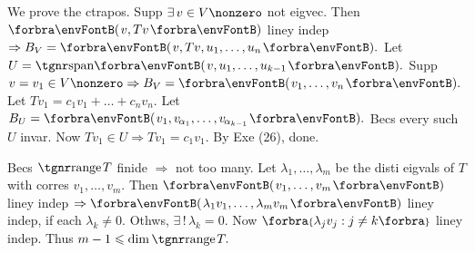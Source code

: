 We prove the ctrapos. Supp $\exists\,v\in V\nonzero$ not eigvec.\parSol{}
Then $\Par{v,Tv}$ liney indep $\Rightarrow B_V=\Par{v,Tv,u_1,\dots,u_n}.$ Let $U=\Span{v,u_1,\dots,u_{k-1}}.$\PfEnd\vspace{3pt}\parSol{}
\Or Supp $v=v_1\in V\nonzero\Rightarrow B_V=\Par{v_1,\dots,v_n}.$ Let $Tv_1=c_1 v_1+\dots+c_n v_n.$\parSol{}
Let $B_U=\Par{v_1,v_{\:\!\!\alpha_1},\dots,v_{\:\!\!\alpha_{k-1}}}.$ Becs every such $U$ invar. Now $Tv_1\in U\Rightarrow Tv_1=c_1v_1.$\parSol{}
By Exe (26), done. \PfEnd%
\SepLine

Becs $\range T$ finide $\Rightarrow$ not too many. Let $\lambda_1,\dots,\lambda_m$ be the disti eigvals of $T$ with corres $v_1,\dots,v_m.$\parSol{}
Then $\Par{v_1,\dots,v_m}$ liney indep $\Rightarrow\Par{\lambda_1 v_1,\dots,\lambda_m v_m}$ liney indep, if each $\lambda_k\neq 0.$ \;Othws,\parSol{}
$\exists\,!\,\lambda_k=0.$ Now $\Bra{\lambda_jv_j:j\neq k}$ liney indep. Thus $m-1\leqslant\dim\range T.$\PfEnd
\SepLine



